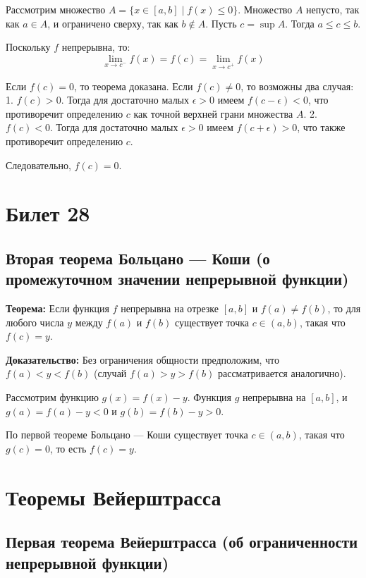 \documentclass{article}
\begin{document}
Рассмотрим множество \( A = \{ x \in [a, b] \mid f(x) \leq 0 \} \). Множество \( A \) непусто, так как \( a \in A \), и ограничено сверху, так как \( b \notin A \). Пусть \( c = \sup A \). Тогда \( a \leq c \leq b \).

Поскольку \( f \) непрерывна, то:
\[
\lim_{x \to c^-} f(x) = f(c) = \lim_{x \to c^+} f(x)
\]

Если \( f(c) = 0 \), то теорема доказана. Если \( f(c) \neq 0 \), то возможны два случая:
1. \( f(c) > 0 \). Тогда для достаточно малых \( \epsilon > 0 \) имеем \( f(c - \epsilon) < 0 \), что противоречит определению \( c \) как точной верхней грани множества \( A \).
2. \( f(c) < 0 \). Тогда для достаточно малых \( \epsilon > 0 \) имеем \( f(c + \epsilon) > 0 \), что также противоречит определению \( c \).

Следовательно, \( f(c) = 0 \).

\section{Билет 28}

\subsection*{Вторая теорема Больцано — Коши (о промежуточном значении непрерывной функции)}

\textbf{Теорема:} Если функция \( f \) непрерывна на отрезке \([a, b]\) и \( f(a) \neq f(b) \), то для любого числа \( y \) между \( f(a) \) и \( f(b) \) существует точка \( c \in (a, b) \), такая что \( f(c) = y \).

\textbf{Доказательство:} Без ограничения общности предположим, что \( f(a) < y < f(b) \) (случай \( f(a) > y > f(b) \) рассматривается аналогично).

Рассмотрим функцию \( g(x) = f(x) - y \). Функция \( g \) непрерывна на \([a, b]\), и \( g(a) = f(a) - y < 0 \) и \( g(b) = f(b) - y > 0 \).

По первой теореме Больцано — Коши существует точка \( c \in (a, b) \), такая что \( g(c) = 0 \), то есть \( f(c) = y \).

\section*{Теоремы Вейерштрасса}

\subsection*{Первая теорема Вейерштрасса (об ограниченности непрерывной функции)}
\end{document}
